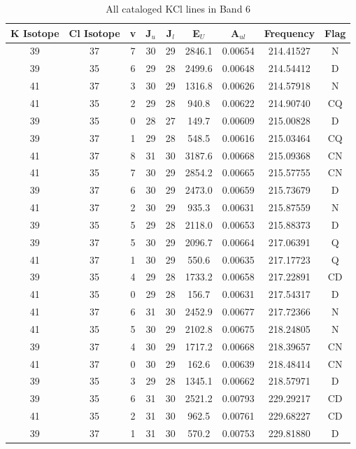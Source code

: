 \begin{table*}[htp]
\centering
\caption{All cataloged KCl lines in Band 6}
\begin{tabular}{ccccccccc}
\label{tab:K_detections_B6}
K Isotope & Cl Isotope & v & J$_u$ & J$_l$ & E$_U$ & A$_{ul}$ & Frequency & Flag \\
\hline
39 & 37 & 7 & 30 & 29 & 2846.1 & 0.00654 & 214.41527 & N \\
39 & 35 & 6 & 29 & 28 & 2499.6 & 0.00648 & 214.54412 & D \\
41 & 37 & 3 & 30 & 29 & 1316.8 & 0.00626 & 214.57918 & N \\
41 & 35 & 2 & 29 & 28 & 940.8 & 0.00622 & 214.90740 & CQ \\
39 & 35 & 0 & 28 & 27 & 149.7 & 0.00609 & 215.00828 & D \\
39 & 37 & 1 & 29 & 28 & 548.5 & 0.00616 & 215.03464 & CQ \\
41 & 37 & 8 & 31 & 30 & 3187.6 & 0.00668 & 215.09368 & CN \\
41 & 35 & 7 & 30 & 29 & 2854.2 & 0.00665 & 215.57755 & CN \\
39 & 37 & 6 & 30 & 29 & 2473.0 & 0.00659 & 215.73679 & D \\
41 & 37 & 2 & 30 & 29 & 935.3 & 0.00631 & 215.87559 & N \\
39 & 35 & 5 & 29 & 28 & 2118.0 & 0.00653 & 215.88373 & D \\
39 & 37 & 5 & 30 & 29 & 2096.7 & 0.00664 & 217.06391 & Q \\
41 & 37 & 1 & 30 & 29 & 550.6 & 0.00635 & 217.17723 & Q \\
39 & 35 & 4 & 29 & 28 & 1733.2 & 0.00658 & 217.22891 & CD \\
41 & 35 & 0 & 29 & 28 & 156.7 & 0.00631 & 217.54317 & D \\
41 & 37 & 6 & 31 & 30 & 2452.9 & 0.00677 & 217.72366 & N \\
41 & 35 & 5 & 30 & 29 & 2102.8 & 0.00675 & 218.24805 & N \\
39 & 37 & 4 & 30 & 29 & 1717.2 & 0.00668 & 218.39657 & CN \\
41 & 37 & 0 & 30 & 29 & 162.6 & 0.00639 & 218.48414 & CN \\
39 & 35 & 3 & 29 & 28 & 1345.1 & 0.00662 & 218.57971 & D \\
39 & 35 & 6 & 31 & 30 & 2521.2 & 0.00793 & 229.29217 & CD \\
41 & 35 & 2 & 31 & 30 & 962.5 & 0.00761 & 229.68227 & CD \\
39 & 37 & 1 & 31 & 30 & 570.2 & 0.00753 & 229.81880 & D \\

\end{tabular}
\end{table*}
